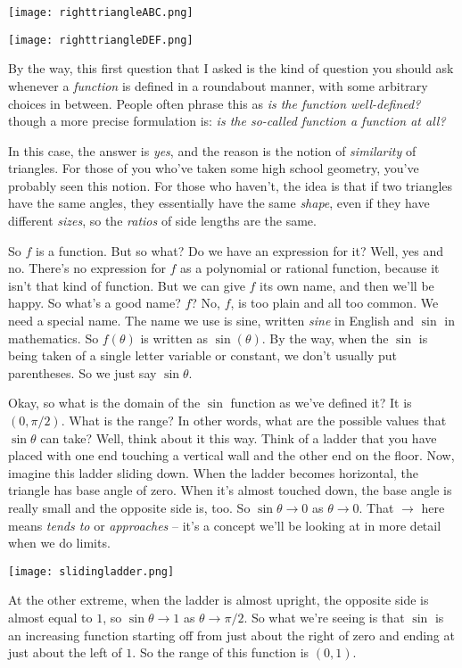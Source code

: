 \documentclass{amsart}
\begin{document}
\texttt{[image: righttriangleABC.png]}

\texttt{[image: righttriangleDEF.png]}

By the way, this first question that I asked is the kind of question
you should ask whenever a {\em function} is defined in a roundabout
manner, with some arbitrary choices in between. People often phrase
this as {\em is the function well-defined?} though a more precise
formulation is: {\em is the so-called function a function at all?}

In this case, the answer is {\em yes}, and the reason is the notion of
{\em similarity} of triangles. For those of you who've taken some high
school geometry, you've probably seen this notion. For those who
haven't, the idea is that if two triangles have the same angles, they
essentially have the same {\em shape}, even if they have different
{\em sizes}, so the {\em ratios} of side lengths are the same.

So $f$ is a function. But so what? Do we have an expression for it?
Well, yes and no. There's no expression for $f$ as a polynomial or
rational function, because it isn't that kind of function. But we can
give $f$ its own name, and then we'll be happy. So what's a good name?
$f$? No, $f$, is too plain and all too common. We need a special
name. The name we use is sine, written {\em sine} in English and
$\sin$ in mathematics. So $f(\theta)$ is written as $\sin(\theta)$. By
the way, when the $\sin$ is being taken of a single letter variable or
constant, we don't usually put parentheses. So we just say $\sin
\theta$.

Okay, so what is the domain of the $\sin$ function as we've defined
it? It is $(0,\pi/2)$. What is the range? In other words, what are the
possible values that $\sin \theta$ can take? Well, think about it this
way. Think of a ladder that you have placed with one end touching a
vertical wall and the other end on the floor. Now, imagine this ladder
sliding down. When the ladder becomes horizontal, the triangle has base
angle of zero. When it's almost touched down, the base angle is really
small and the opposite side is, too. So $\sin \theta \to 0$ as $\theta
\to 0$. That $\to$ here means {\em tends to} or {\em approaches} --
it's a concept we'll be looking at in more detail when we do limits.

\texttt{[image: slidingladder.png]}

At the other extreme, when the ladder is almost upright, the opposite
side is almost equal to $1$, so $\sin \theta \to 1$ as $\theta \to
\pi/2$. So what we're seeing is that $\sin$ is an increasing function
starting off from just about the right of zero and ending at just
about the left of $1$. So the range of this function is $(0,1)$.
\end{document}
